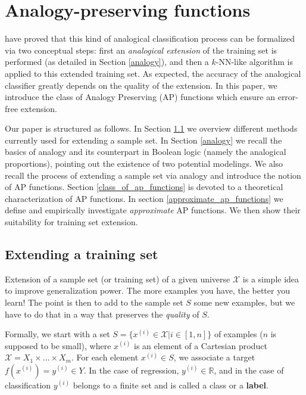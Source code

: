 \chapter{Analogy-preserving functions}

\cite{HugPraRicSerECAI2016} have proved that this kind of analogical
classification process can be formalized via two conceptual steps: first an
{\it analogical  extension} of the training set is performed (as detailed in
Section \ref{analogy}), and then a $k$-NN-like algorithm is applied to this
extended training set.  As expected, the accuracy of the analogical classifier
greatly depends on the quality of the extension. In this  paper, we introduce
the class of Analogy Preserving (AP) functions which ensure an error-free
extension.

Our paper is structured as follows. In Section \ref{extending} we overview
different methods currently used for extending a sample set.  In Section
\ref{analogy} we recall the basics of analogy and its counterpart in Boolean
logic (namely the analogical proportions), pointing out the existence of two
potential modelings. We also recall the process of
extending a sample set via analogy and introduce the notion of AP functions.
Section \ref{class_of_ap_functions} is devoted to a theoretical
characterization of AP functions. In section \ref{approximate_ap_functions} we
define and empirically investigate \textit{approximate} AP functions. We then
show their suitability for training set extension.

\section{Extending a training set}\label{extending}
Extension of a sample set (or training set) of a given universe $\mathcal{X}$
is a simple idea to improve generalization power. The more examples you have,
the better you learn! The point is then to add to the sample set $S$ some new
examples, but we have to do that in a way that preserves the \textit{quality}
of $S$.

Formally, we start with a set $S= \{x^{(i)} \in \mathcal{X}| i \in [1,n]\}$ of
examples ($n$ is supposed to be small), where $x^{(i)}$ is an
element of a Cartesian product $\mathcal{X} = X_1 \times \ldots \times X_m$.
For each element  $x^{(i)} \in S$, we associate a target  $f(x^{(i)})=y^{(i)}
\in Y$.  In the case of regression, $y^{(i)} \in \mathbb{R}$, and in the case
of classification $y^{(i)}$ belongs to a finite set and is called a class
or a \textbf{label}.

